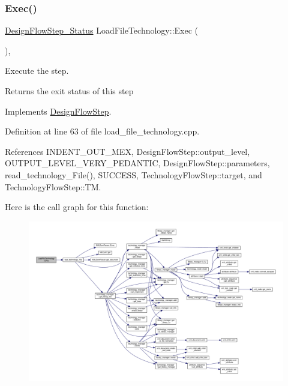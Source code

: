 \mbox{\label{classLoadFileTechnology_a5059ff57d50028e3eb11cc0e77451034}} 
\subsubsection{\texorpdfstring{Exec()}{Exec()}}
{\footnotesize\ttfamily \hyperlink{design__flow__step_8hpp_afb1f0d73069c26076b8d31dbc8ebecdf}{Design\+Flow\+Step\+\_\+\+Status} Load\+File\+Technology\+::\+Exec (\begin{DoxyParamCaption}{ }\end{DoxyParamCaption})\hspace{0.3cm}{\ttfamily [override]}, {\ttfamily [virtual]}}



Execute the step. 

\begin{DoxyReturn}{Returns}
the exit status of this step 
\end{DoxyReturn}


Implements \hyperlink{classDesignFlowStep_a77d7e38493016766098711ea24f60b89}{Design\+Flow\+Step}.



Definition at line 63 of file load\+\_\+file\+\_\+technology.\+cpp.



References I\+N\+D\+E\+N\+T\+\_\+\+O\+U\+T\+\_\+\+M\+EX, Design\+Flow\+Step\+::output\+\_\+level, O\+U\+T\+P\+U\+T\+\_\+\+L\+E\+V\+E\+L\+\_\+\+V\+E\+R\+Y\+\_\+\+P\+E\+D\+A\+N\+T\+IC, Design\+Flow\+Step\+::parameters, read\+\_\+technology\+\_\+\+File(), S\+U\+C\+C\+E\+SS, Technology\+Flow\+Step\+::target, and Technology\+Flow\+Step\+::\+TM.

Here is the call graph for this function\+:
\nopagebreak
\begin{figure}[H]
\begin{center}
\leavevmode
\includegraphics[width=350pt]{dd/dc2/classLoadFileTechnology_a5059ff57d50028e3eb11cc0e77451034_cgraph}
\end{center}
\end{figure}


